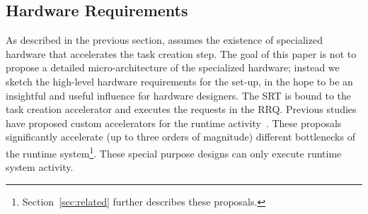 \subsection{Hardware Requirements}
\label{sec:hw_req}

As described in the previous section, {\proposal} assumes the existence of specialized hardware that accelerates the task creation step. 
The goal of this paper is not to propose a detailed micro-architecture of the specialized hardware; instead we sketch the high-level hardware requirements for the {\proposal} set-up, in the hope to be an insightful and useful influence for hardware designers.
The SRT is bound to the task creation accelerator and executes the requests in the RRQ. 
Previous studies have proposed custom accelerators for the runtime activity~\cite{TaskSS, Xubin, Nexus, Swarm, TMU, Carbon}. 
These proposals significantly accelerate (up to three orders of magnitude) different bottlenecks of the runtime system\footnote{Section~\ref{sec:related} further describes these proposals.}. 
These special purpose designs can only execute runtime system activity.

\begin{figure}[t!]%
	\centering
	 \hspace{0.2cm}
	\caption{}
\end{figure}


